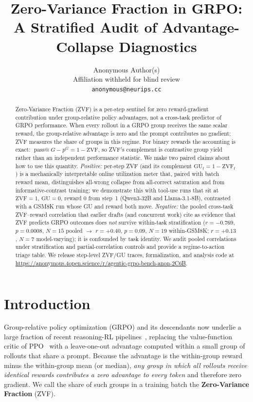 \documentclass{article}
\title{Zero-Variance Fraction in GRPO: A Stratified Audit of Advantage-Collapse Diagnostics}
\author{Anonymous Author(s)\\
  Affiliation withheld for blind review\\
  \texttt{anonymous@neurips.cc}}
\begin{document}
\sloppy
{}
\hfuzz=2pt

\maketitle

\begin{abstract}
Zero-Variance Fraction (ZVF) is a per-step sentinel for zero reward-gradient
contribution under group-relative policy advantages, not a cross-task
predictor of GRPO performance. When every rollout in a GRPO group receives
the same scalar reward, the group-relative advantage is zero and the prompt
contributes no gradient; ZVF measures the share of groups in this regime. For
binary rewards the accounting is exact:
$\operatorname{pass@}G-p^G=1-\mathrm{ZVF}$, so ZVF's complement is
contrastive group yield rather than an independent performance statistic.
We make two paired claims about how to use this quantity. \emph{Positive:}
per-step ZVF (and its complement $\mathrm{GU}_t = 1-\mathrm{ZVF}_t$) is a
mechanically interpretable online utilization meter that, paired with batch
reward mean, distinguishes all-wrong collapse from all-correct saturation
and from informative-contrast training; we demonstrate this with tool-use
runs that sit at $\mathrm{ZVF}{=}1$, $\mathrm{GU}{=}0$, reward $0$ from
step~1 (Qwen3-32B and Llama-3.1-8B), contrasted with a GSM8K run whose
GU and reward both move. \emph{Negative:} the pooled cross-task ZVF--reward
correlation that earlier drafts (and concurrent work) cite as evidence that
ZVF predicts GRPO outcomes does \emph{not} survive within-task
stratification ($r{=}-0.769$, $p{=}0.0008$, $N{=}15$ pooled $\to$ $r{=}+0.40$,
$p{=}0.09$, $N{=}19$ within-GSM8K; $r{=}+0.13$, $N{=}7$ model-varying); it is
confounded by task identity. We audit pooled correlations under stratification
and partial-correlation controls and provide a regime-to-action triage table.
We release step-level ZVF/GU traces, formalization, and analysis code at
\url{https://anonymous.4open.science/r/agentic-grpo-bench-anon-2C6B}.
\end{abstract}
 
\section{Introduction}
\label{sec:intro}

Group-relative policy optimization (GRPO) and its descendants now underlie a
large fraction of recent reasoning-RL pipelines~\citep{shao2024deepseekmath,guo2025deepseekr1nature}, replacing the value-function critic of
PPO~\citep{schulman2017proximal} with a leave-one-out advantage computed
within a small group of rollouts that share a prompt. Because the advantage
is the within-group reward minus the within-group mean (or median),
\emph{any group in which all rollouts receive identical rewards contributes a
zero advantage to every token} and therefore zero gradient. We call the
share of such groups in a training batch the \textbf{Zero-Variance Fraction}
(ZVF).
\end{document}
